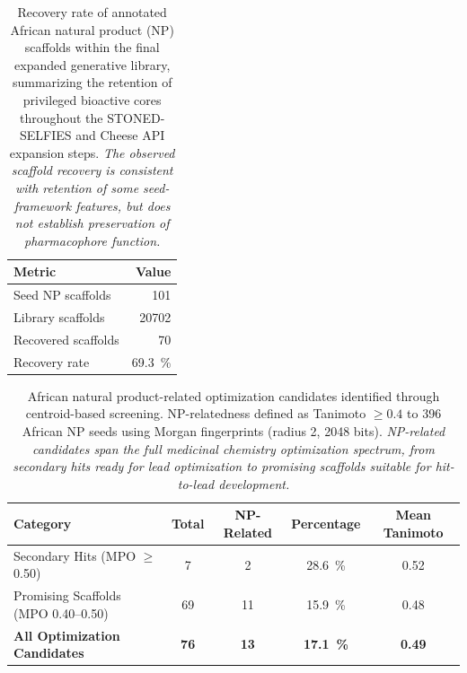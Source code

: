 \documentclass[journal=jcisd8,manuscript=suppinfo]{achemso}
\begin{document}
\begin{table}[!htbp]
\centering
\caption{Recovery rate of annotated African natural product (NP) scaffolds within the final expanded generative library, summarizing the retention of privileged bioactive cores throughout the STONED-SELFIES and Cheese API expansion steps. \textit{The observed scaffold recovery is consistent with retention of some seed-framework features, but does not establish preservation of pharmacophore function.}}
\label{tab:scaffold_recovery}
\begin{tabular}{@{}l r@{}}
\toprule
\textbf{Metric} & \textbf{Value} \\
\midrule
Seed NP scaffolds & \num{101} \\
Library scaffolds & \num{20702} \\
Recovered scaffolds & \num{70} \\
Recovery rate & \qty{69.3}{\percent} \\
\bottomrule
\end{tabular}
\end{table}

\begin{table}[!htbp]
\centering
\caption{African natural product-related optimization candidates identified through centroid-based screening. NP-relatedness defined as Tanimoto $\geq \num{0.4}$ to \num{396} African NP seeds using Morgan fingerprints (radius 2, 2048 bits). \textit{NP-related candidates span the full medicinal chemistry optimization spectrum, from secondary hits ready for lead optimization to promising scaffolds suitable for hit-to-lead development.}}
\label{tab:np_related_summary}
\begin{tabular}{@{}lcccc@{}}
\toprule
\textbf{Category} & \textbf{Total} & \textbf{NP-Related} & \textbf{Percentage} & \textbf{Mean Tanimoto} \\
\midrule
Secondary Hits (MPO $\geq$ 0.50) & \num{7} & \num{2} & \qty{28.6}{\percent} & \num{0.52} \\
Promising Scaffolds (MPO 0.40--0.50) & \num{69} & \num{11} & \qty{15.9}{\percent} & \num{0.48} \\
\midrule
\textbf{All Optimization Candidates} & \textbf{\num{76}} & \textbf{\num{13}} & \textbf{\qty{17.1}{\percent}} & \textbf{\num{0.49}} \\
\bottomrule
\end{tabular}
\end{table}
\end{document}
